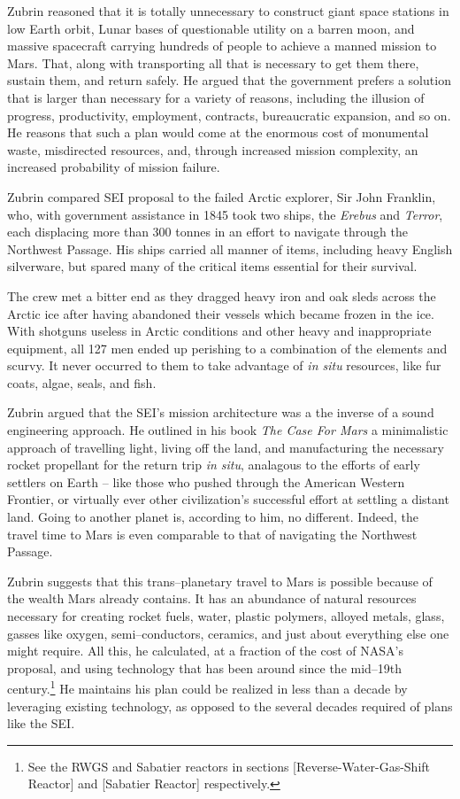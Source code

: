 Zubrin reasoned that it is totally unnecessary to construct giant space stations in low Earth orbit, Lunar bases of questionable utility on a barren moon, and massive spacecraft carrying hundreds of people to achieve a manned mission to Mars. That, along with transporting all that is necessary to get them there, sustain them, and return safely. He argued that the government prefers a solution that is larger than necessary for a variety of reasons, including the illusion of progress, productivity, employment, contracts, bureaucratic expansion, and so on. He reasons that such a plan would come at the enormous cost of monumental waste, misdirected resources, and, through increased mission complexity, an increased probability of mission failure.

Zubrin compared SEI proposal to the failed Arctic explorer, Sir John Franklin, who, with government assistance in 1845 took two ships, the {\it Erebus} and {\it Terror}, each displacing more than 300 tonnes in an effort to navigate through the Northwest Passage. His ships carried all manner of items, including heavy English silverware, but spared many of the critical items essential for their survival. 

The crew met a bitter end as they dragged heavy iron and oak sleds across the Arctic ice after having abandoned their vessels which became frozen in the ice. With shotguns useless in Arctic conditions and other heavy and inappropriate equipment, all 127 men ended up perishing to a combination of the elements and scurvy. It never occurred to them to take advantage of {\it in situ} resources, like fur coats, algae, seals, and fish.

Zubrin argued that the SEI's mission architecture was a the inverse of a sound engineering approach. He outlined in his book {\it The Case For Mars} a minimalistic approach of travelling light, living off the land, and manufacturing the necessary rocket propellant for the return trip {\it in situ}, analagous to the efforts of early settlers on Earth -- like those who pushed through the American Western Frontier, or virtually ever other civilization's successful effort at settling a distant land. Going to another planet is, according to him, no different. Indeed, the travel time to Mars is even comparable to that of navigating the Northwest Passage.

Zubrin suggests that this trans--planetary travel to Mars is possible because of the wealth Mars already contains. It has an abundance of natural resources necessary for creating rocket fuels, water, plastic polymers, alloyed metals, glass, gasses like oxygen, semi--conductors, ceramics, and just about everything else one might require. All this, he calculated, at a fraction of the cost of NASA's proposal, and using technology that has been around since the mid--19th century.\footnote{See the RWGS and Sabatier reactors in sections \in{}[Reverse-Water-Gas-Shift Reactor] and \in{}[Sabatier Reactor] respectively.} He maintains his plan could be realized in less than a decade by leveraging existing technology, as opposed to the several decades required of plans like the SEI.

